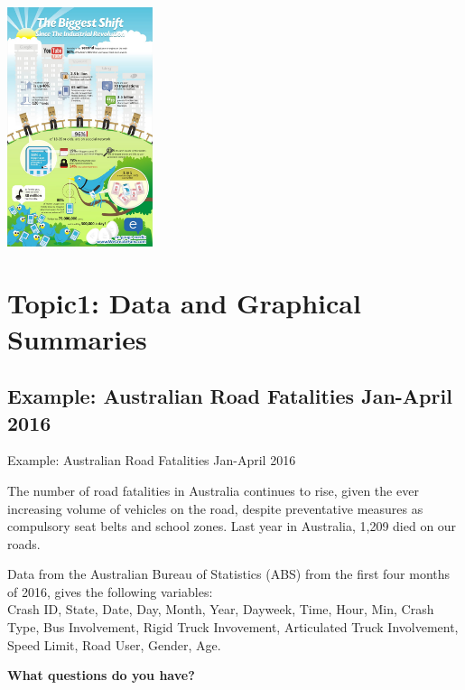 \documentclass[t,xcolor=pdftex,dvipsnames,table]{beamer}\usepackage[]{graphicx}\usepackage[]{color}
\begin{document}
\begin{frame}{}
\begin{center}
\includegraphics[height=7cm]{../images/SocialMediaStats.jpg}
\end{center}
\href{http://www.socialfactor.com/social-media-the-biggest-shift-since-the-industrial-revolution}{}  %
\end{frame}




\section[1]{Topic1: Data and Graphical Summaries}

\subsection[]{Example: Australian Road Fatalities Jan-April 2016}
\begin{frame}{Example: Australian Road Fatalities Jan-April 2016}

The number of road fatalities in Australia continues to rise, given the ever increasing volume of vehicles on the road, despite preventative measures as compulsory seat belts and school zones. Last year in Australia, 1,209 died on our roads.

\vspace{.5cm}
Data from the Australian Bureau of Statistics (ABS) from the first four months of 2016, gives the following variables: \\

Crash ID, State, Date, Day, Month, Year, Dayweek, Time, Hour, Min, Crash Type, Bus Involvement, Rigid Truck Invovement, Articulated Truck Involvement, Speed Limit, Road User, Gender, Age.
\href{http://www.maths.usyd.edu.au/u/UG/JM/StatsData.html}{} 

\vspace{.5cm}
{\bf What questions do you have?}
\end{frame}
\end{document}
